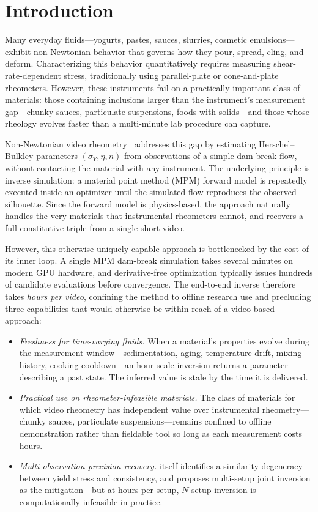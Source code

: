 \section{Introduction}

Many everyday fluids---yogurts, pastes, sauces, slurries, cosmetic
emulsions---exhibit non-Newtonian behavior that governs how they pour,
spread, cling, and deform. Characterizing this behavior quantitatively
requires measuring shear-rate-dependent stress, traditionally using
parallel-plate or cone-and-plate rheometers. However, these instruments
fail on a practically important class of materials: those containing
inclusions larger than the instrument's measurement gap---chunky sauces,
particulate suspensions, foods with solids---and those whose rheology
evolves faster than a multi-minute lab procedure can capture.

Non-Newtonian video rheometry~\cite{hamamichi2023nonnewtonian} addresses
this gap by estimating Herschel--Bulkley parameters
$(\sigma_Y, \eta, n)$ from observations of a simple dam-break flow,
without contacting the material with any instrument. The underlying
principle is inverse simulation: a material point method (MPM) forward
model is repeatedly executed inside an optimizer until the simulated
flow reproduces the observed silhouette. Since the forward model is
physics-based, the approach naturally handles the very materials that
instrumental rheometers cannot, and recovers a full constitutive triple
from a single short video.

However, this otherwise uniquely capable approach is bottlenecked by the
cost of its inner loop. A single MPM dam-break simulation takes several
minutes on modern GPU hardware, and derivative-free optimization
typically issues hundreds of candidate evaluations before convergence.
The end-to-end inverse therefore takes \emph{hours per video}, confining
the method to offline research use and precluding three capabilities
that would otherwise be within reach of a video-based approach:

\begin{itemize}
    \item \emph{Freshness for time-varying fluids.} When a material's
    properties evolve during the measurement window---sedimentation,
    aging, temperature drift, mixing history, cooking
    cooldown---an hour-scale inversion returns a parameter describing a
    past state. The inferred value is stale by the time it is delivered.
    \item \emph{Practical use on rheometer-infeasible materials.} The
    class of materials for which video rheometry has independent value
    over instrumental rheometry---chunky sauces, particulate
    suspensions---remains confined to offline demonstration rather than
    fieldable tool so long as each measurement costs hours.
    \item \emph{Multi-observation precision recovery.}
    \cite{hamamichi2023nonnewtonian} itself identifies a similarity
    degeneracy between yield stress and consistency, and proposes
    multi-setup joint inversion as the mitigation---but at hours per
    setup, $N$-setup inversion is computationally infeasible in
    practice.
\end{itemize}

